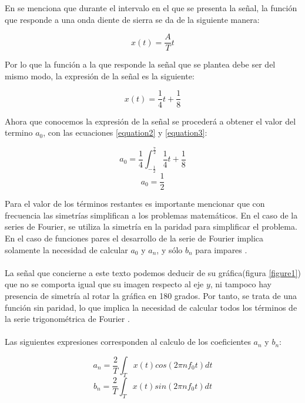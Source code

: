 \documentclass[7pt]{article}
\begin{document}
    En \cite{Sawtooth} se menciona que durante el intervalo en el que se presenta la señal, la función que 
    responde a una onda diente de sierra se da de la siguiente manera:
    
    \begin{equation*}
        x(t)=\frac{A}{T} t
    \end{equation*}

    Por lo que la función a la que responde la señal que se plantea debe ser del mismo modo, la expresión 
    de la señal es la siguiente:

    \begin{equation}
        x(t)=\frac{1}{4} t+\frac{1}{8}
        \label{equation3}
    \end{equation}

    Ahora que conocemos la expresión de la señal se procederá a obtener el valor del termino $a_{0}$, con las 
    ecuaciones \ref{equation2} y \ref{equation3}:

    \begin{equation*}
        a_{0}=\frac{1}{4} \int_{-\frac{1}{2}}^{\frac{7}{2}} \frac{1}{4} t+\frac{1}{8}
    \end{equation*}
    \begin{equation}
        a_{0}=\frac{1}{2}
        \label{equation4}
    \end{equation}    

    Para el valor de los términos restantes es importante mencionar que con frecuencia las simetrías simplifican 
    a los problemas matemáticos. En el caso de la series de Fourier, se utiliza la simetría en la paridad para 
    simplificar el problema. En el caso de funciones pares el desarrollo de la serie de Fourier implica solamente 
    la necesidad de calcular $a_{0}$ y $a_{n}$, y sólo $b_{n}$ para impares \cite{parimpar}.\\
    \\
    La señal que concierne a este texto podemos deducir de su gráfica(figura \ref{figure1}) que no se comporta igual que su imagen respecto 
    al eje $y$, ni tampoco hay presencia de simetría al rotar la gráfica en 180 grados. Por tanto, se trata de una 
    función sin paridad, lo que implica la necesidad de calcular todos los términos de la serie trigonométrica de Fourier .\\
    \\
    Las siguientes expresiones corresponden al calculo de los coeficientes $a_{n}$ y $b_{n}$:

    \begin{equation}
        a_{n}=\frac{2}{T} \int_{T} x(t)cos(2\pi nf_{0}t)dt
        \label{equation5}
    \end{equation}
    \begin{equation}
        b_{n}=\frac{2}{T} \int_{T} x(t)sin(2\pi nf_{0}t)dt
        \label{equation6}
    \end{equation}
\end{document}
